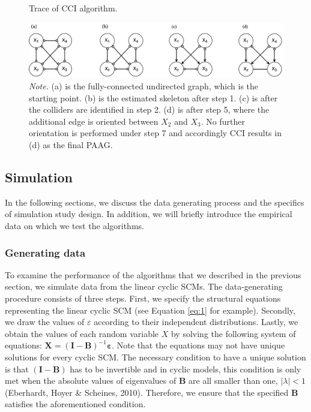 \documentclass[11pt]{article}
\theoremstyle{definition}
\begin{document}
\begin{figure}[H]
    \centering
        \caption{Trace of CCI algorithm.}
        \vspace{1mm}
        \includegraphics[width=1.0\textwidth]{figures/CCItrace.png}
        \vspace{1mm}
        \caption*{\textit{Note.} (a) is the fully-connected undirected graph, which is the starting point. (b) is the estimated skeleton after step 1. (c) is after the colliders are identified in step 2. (d) is after step 5, where the additional edge is oriented between $X_2$ and $X_3$. No further orientation is performed under step 7 and accordingly CCI results in (d) as the final PAAG.}
    \label{fig:10}
\end{figure}




\subsection{Simulation}

In the following sections, we discuss the data generating process and the specifics of simulation study design. In addition, we will briefly introduce the empirical data on which we test the algorithms.

\subsubsection{Generating data}
To examine the performance of the algorithms that we described in the previous section, we simulate data from the linear cyclic SCMs. The data-generating procedure consists of three steps. First, we specify the structural equations representing the linear cyclic SCM (see Equation \ref{eq:1} for example). Secondly, we draw the values of $\varepsilon$ according to their independent distributions. Lastly, we obtain the values of each random variable $X$ by solving the following system of equations: $\mathbf{X} = (\mathbf{I} - \mathbf{B})^{-1}\mathbf{\varepsilon}$. Note that the equations may not have unique solutions for every cyclic SCM. The necessary condition to have a unique solution is that $(\mathbf{I} - \mathbf{B})$ has to be invertible and in cyclic models, this condition is only met when the absolute values of eigenvalues of $\mathbf{B}$ are all smaller than one, $|\lambda| < 1$ (Eberhardt, Hoyer \& Scheines, 2010). Therefore, we ensure that the specified $\mathbf{B}$ satisfies the aforementioned condition.
\end{document}
